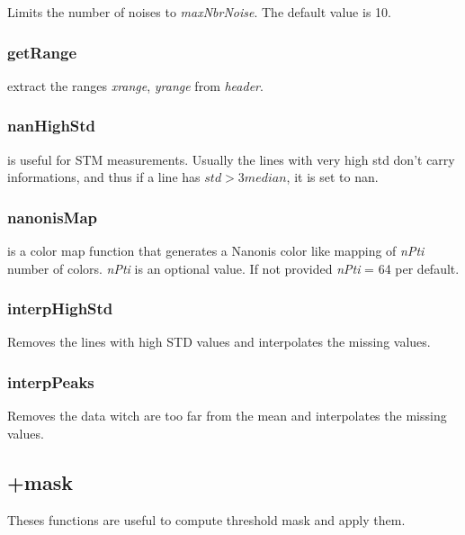  Limits the number of noises to \emph{maxNbrNoise}. The default value is 10.
\edf
\subsubsection{getRange}
\bdf
{} extract the ranges \emph{xrange}, \emph{yrange} from \emph{header}.
\edf
\subsubsection{nanHighStd}
\bdf
{} is useful for STM measurements. Usually the lines with very high std don't carry informations, and thus if a line has $std > 3 median$, it is set to nan.
\edf
\subsubsection{nanonisMap}
\bdf
{} is a color map function that generates a Nanonis color like mapping of \emph{nPti} number of colors. \emph{nPti} is an optional value. If not provided \emph{nPti} = 64 per default. 
\edf
\subsubsection{interpHighStd}
\bdf
{} Removes the lines with high STD values and interpolates the missing values.
\edf
\subsubsection{interpPeaks}
\bdf
{} Removes the data witch are too far from the mean and interpolates the missing values.
\edf

\subsection{+mask}
Theses functions are useful to compute threshold mask and apply them.
